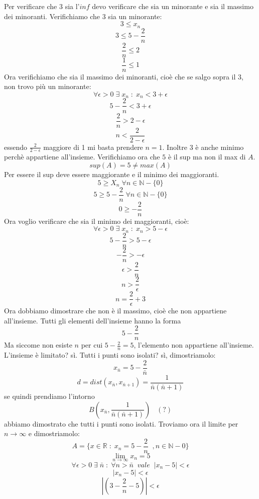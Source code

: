 Per verificare che $3$ sia l'$inf$ devo verificare che sia un minorante e sia il massimo dei minoranti.
\newline
Verifichiamo che $3$ sia un minorante:
\[
    3 \leq x_n
\]
\[
    3 \leq 5 - \frac{2}{n}    
\]
\[
    \frac{2}{n} \leq 2
\]
\[
    \frac{1}{n} \leq 1
\]
Ora verifichiamo che sia il massimo dei minoranti, cioè che se salgo sopra il $3$, non trovo più un minorante:
\[
    \forall \epsilon > 0 \;\exists\; x_n \;:\; x_n < 3+\epsilon
\]
\[
    5-\frac{2}{n} < 3 +\epsilon    
\]
\[
    \frac{2}{n} > 2 -\epsilon
\]
\[
    n < \frac{2}{2-\epsilon}
\]
essendo $\frac{2}{2-\epsilon}$ maggiore di 1 mi basta prendere $n=1$.
\newline
Inoltre $3$ è anche minimo perchè appartiene all'insieme.
\newline
Verifichiamo ora che $5$ è il sup ma non il max di $A$.
\[
    sup(A)=5 \neq max(A)
\]
Per essere il sup deve essere maggiorante e il minimo dei maggioranti.
\[
    5 \geq X_n \;  \forall n \in \mathbb{N}-\{0\}
\]
\[
    5\geq 5 - \frac{2}{n} \;  \forall n \in \mathbb{N}-\{0\}
\]
\[
    0\geq -\frac{2}{n}
\]
Ora voglio verificare che sia il minimo dei maggioranti, cioè:
\[
        \forall \epsilon>0 \;\exists\; x_n \;:\; x_n > 5-\epsilon
\]
\[
    5-\frac{2}{n}> 5-\epsilon
\]
\[
    -\frac{2}{n}> -\epsilon
\]
\[
    \epsilon > \frac{2}{n}
\]
\[
    n > \frac{2}{\epsilon}
\]
\[
    n = \frac{2}{\epsilon} +3
\]
Ora dobbiamo dimostrare che non è il massimo, cioè che non appartiene all'insieme.
\newline
Tutti gli elementi dell'insieme hanno la forma 
\[
    5-\frac{2}{n}
\]
Ma siccome non esiste $n$ per cui $5-\frac{2}{n} = 5$, l'elemento non appartiene all'insieme.
\newline
L'insieme è limitato? sì.
\newline
Tutti i punti sono isolati? sì, dimostriamolo:
\[
    x_{\bar{n}} = 5 - \frac{2}{\bar{n}}
\]
\[
    d = dist(x_{\bar{n}}, x_{\bar{n}+1}) = \frac{1}{\bar{n}(\bar{n}+1)}
\]
se quindi prendiamo l'intorno
\[
    B(x_{\bar{n}},\frac{1}{\bar{n}(\bar{n}+1)}) \;\;\;(?)
\]
abbiamo dimostrato che tutti i punti sono isolati.
\newline
Troviamo ora il limite per $n \rightarrow \infty$ e dimostriamolo:
\[
    A = \{x \in \mathbb{R} \;:\; x_n = 5-\frac{2}{n} \;\;, n\in \mathbb{N} -{0}\}
\]
\[
    \lim_{n \rightarrow \infty} x_n = 5
\]
\[
    \forall \epsilon > 0 \;\exists\; \bar{n} \;:\; \forall n > \bar{n} \;\;vale\;\; |x_n-5| < \epsilon 
\]
\[
    |x_n-5| <\epsilon 
\]
\[
    |(3-\frac{2}{n}- 5)| < \epsilon
\]
